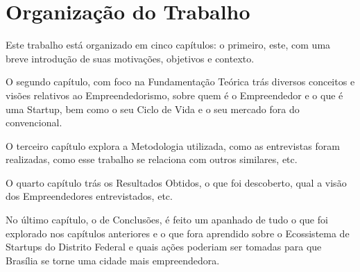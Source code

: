 \section{Organização do Trabalho}
\label{section:organizacao_do_trabalho}

Este trabalho está organizado em cinco capítulos: o primeiro, este, com uma breve introdução de suas motivações, objetivos e contexto. 

O segundo capítulo, com foco na Fundamentação Teórica trás diversos conceitos e visões relativos ao Empreendedorismo, sobre quem é o Empreendedor e o que é uma Startup, bem como o seu Ciclo de Vida e o seu mercado fora do convencional. 

O terceiro capítulo explora a Metodologia utilizada, como as entrevistas foram realizadas, como esse trabalho se relaciona com outros similares, etc. 

O quarto capítulo trás os Resultados Obtidos, o que foi descoberto, qual a visão dos Empreendedores entrevistados, etc.

No último capítulo, o de Conclusões, é feito um apanhado de tudo o que foi explorado nos capítulos anteriores e o que fora aprendido sobre o Ecossistema de Startups do Distrito Federal e quais ações poderiam ser tomadas para que Brasília se torne uma cidade mais empreendedora.